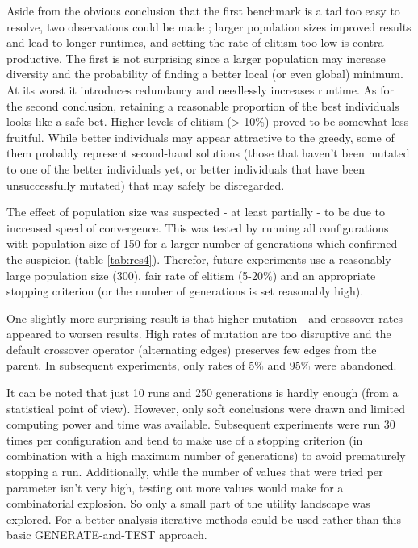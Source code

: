 \par\noindent Aside from the obvious conclusion that the first benchmark is a tad too easy to resolve, two observations could be made ; larger population sizes improved results and lead to longer runtimes, and setting the rate of elitism too low is contra-productive. The first is not surprising since a larger population may increase diversity and the probability of finding a better local (or even global) minimum. At its worst it introduces redundancy and needlessly increases runtime. As for the second conclusion, retaining a reasonable proportion of the best individuals looks like a safe bet. Higher levels of elitism (> 10\%) proved to be somewhat less fruitful. While better individuals may appear attractive to the greedy, some of them probably represent second-hand solutions (those that haven't been mutated to one of the better individuals yet, or better individuals that have been unsuccessfully mutated) that may safely be disregarded.\\

\par\noindent The effect of population size was suspected - at least partially - to be due to increased speed of convergence. This was tested by running all configurations with population size of 150 for a larger number of generations which confirmed the suspicion (table \ref{tab:res4}). Therefor, future experiments use a reasonably large population size (300), fair rate of elitism (5-20\%) and an appropriate stopping criterion (or the number of generations is set reasonably high).\\

\par\noindent One slightly more surprising result is that higher mutation - and crossover rates appeared to worsen results. High rates of mutation are too disruptive and the default crossover operator (alternating edges) preserves few edges from the parent. In subsequent experiments, only rates of 5\% and 95\% were abandoned.\\

\par\noindent It can be noted that just 10 runs and 250 generations is hardly enough (from a statistical point of view). However, only soft conclusions were drawn and limited computing power and time was available. Subsequent experiments were run 30 times per configuration and tend to make use of a stopping criterion (in combination with a high maximum number of generations) to avoid prematurely stopping a run. Additionally, while the number of values that were tried per parameter isn't very high, testing out more values would make for a combinatorial explosion. So only a small part of the utility landscape was explored. For a better analysis iterative methods could be used rather than this basic GENERATE-and-TEST approach.

